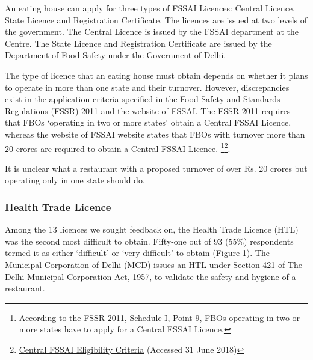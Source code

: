 \documentclass[a4paper, 12pt]{article}
\begin{document}
                    An eating house can apply for three types of FSSAI Licences: Central Licence, State Licence and Registration Certificate. The licences are issued at two levels of the government. The Central Licence is issued by the FSSAI department at the Centre. 
The State Licence and Registration Certificate are issued by the Department of Food Safety under the Government of Delhi.
                    
                    The type of licence that an eating house must obtain depends on whether it plans to operate in more than one state and their turnover. However, discrepancies exist in the application criteria specified in the Food Safety and Standards Regulations 
(FSSR) 2011 and the website of FSSAI. The FSSR 2011 requires that FBOs ‘operating in two or more states’ obtain a Central FSSAI Licence, whereas the website of FSSAI website states that FBOs with turnover more than 20 crores are required to obtain a 
Central FSSAI Licence. \footnote{According to the FSSR 2011, Schedule I, Point 9, FBOs operating in two or more states have to apply for a Central FSSAI Licence.}\footnote{\href{https://bit.ly/2pbFEXM}{Central FSSAI Eligibility Criteria} (Accessed 31 June 
2018)}.%
                    
                    It is unclear what a restaurant with a proposed turnover of over Rs. 20 crores but operating only in one state should do. %
                    
                    
                          
                                         
                    \subsubsection{Health Trade Licence}
                    Among the 13 licences we sought feedback on, the Health Trade Licence (HTL) was the second most difficult to obtain. Fifty-one out of 93 (55\%) respondents termed it as either ‘difficult’ or ‘very difficult’ to obtain (Figure 1). The Municipal Corporation 
of Delhi (MCD) issues an HTL under Section 421 of The Delhi Municipal Corporation Act, 1957, to validate the safety and hygiene of a restaurant.
                    
\end{document}
